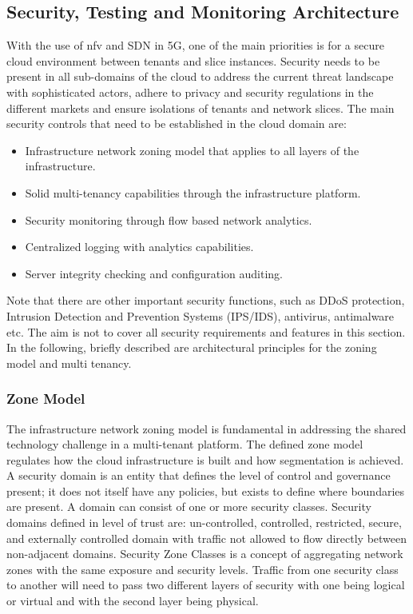     \subsection{Security, Testing and Monitoring Architecture}
    With the use of \acrshort{nfv} and SDN in 5G, one of the main priorities is for a secure cloud environment between tenants and slice instances. Security needs to be present in all sub-domains of the cloud to address the current threat landscape with sophisticated actors, adhere to privacy and security regulations in the different markets and ensure isolations of tenants and network slices. The main security controls that need to be established in the cloud domain are:
    \begin{itemize}
    \item Infrastructure network zoning model that applies to all layers of the infrastructure.
    \item Solid multi-tenancy capabilities through the infrastructure platform.
    \item Security monitoring through flow based network analytics.
    \item Centralized logging with analytics capabilities.
    \item Server integrity checking and configuration auditing.
    \end{itemize}
    Note that there are other important security functions, such as DDoS protection, Intrusion Detection and Prevention Systems (IPS/IDS), antivirus, antimalware etc. The aim is not to cover all security requirements and features in this section. In the following, briefly described are architectural principles for the zoning model and multi tenancy.

        \subsubsection{Zone Model}
        The infrastructure network zoning model is fundamental in addressing the shared technology challenge in a multi-tenant platform. The defined zone model regulates how the cloud infrastructure is built and how segmentation is achieved.
        A security domain is an entity that defines the level of control and governance present; it does not itself have any policies, but exists to define where boundaries are present. A domain can consist of one or more security classes. Security domains defined in level of trust are: un-controlled, controlled, restricted, secure, and externally controlled domain with traffic not allowed to flow directly between non-adjacent domains. Security Zone Classes is a concept of aggregating network zones with the same exposure and security levels. Traffic from one security class to another will need to pass two different layers of security with one being logical or virtual and with the second layer being physical.

